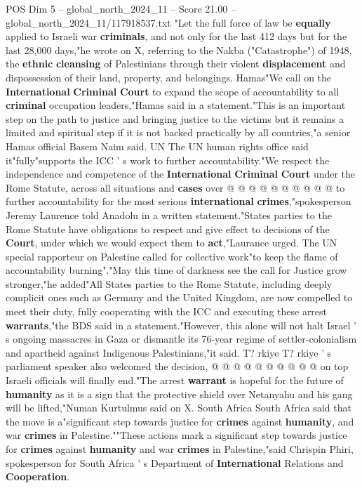 \begin{textsample}{POS Dim 5 – global\_north\_2024\_11 – Score 21.00 – global\_north\_2024\_11/117918537.txt}  \label{ex:f5_pos_037}
"Let the full force of law be \textbf{equally} applied to Israeli war \textbf{criminals}, and not only for the last 412 days but for the last 28,000 days,"he wrote on X, referring to the Nakba ("Catastrophe") of 1948, the \textbf{ethnic} \textbf{cleansing} of Palestinians through their violent \textbf{displacement} and dispossession of their land, property, and belongings.
Hamas"We call on the \textbf{International} \textbf{Criminal} \textbf{Court} to expand the scope of accountability to all \textbf{criminal} occupation leaders,"Hamas said in a statement."This is an important step on the path to justice and bringing justice to the victims but it remains a limited and spiritual step if it is not backed practically by all countries,"a senior Hamas official Basem Naim said.
UN The UN human rights office said it"fully"supports the ICC ' s work to further accountability."We respect the independence and competence of the \textbf{International} \textbf{Criminal} \textbf{Court} under the Rome Statute, across all situations and \textbf{cases} over @ @ @ @ @ @ @ @ @ @ to further accountability for the most serious \textbf{international} \textbf{crimes},"spokesperson Jeremy Laurence told Anadolu in a written statement."States parties to the Rome Statute have obligations to respect and give effect to decisions of the \textbf{Court}, under which we would expect them to \textbf{act},"Laurance urged.
The UN special rapporteur on Palestine called for collective work"to keep the flame of accountability burning"."May this time of darkness see the call for Justice grow stronger,"he added"All States parties to the Rome Statute, including deeply complicit ones such as Germany and the United Kingdom, are now compelled to meet their duty, fully cooperating with the ICC and executing these arrest \textbf{warrants},"the BDS said in a statement."However, this alone will not halt Israel ' s ongoing massacres in Gaza or dismantle its 76-year regime of settler-colonialism and apartheid against Indigenous Palestinians,"it said.
T? rkiye T? rkiye ' s parliament speaker also welcomed the decision, @ @ @ @ @ @ @ @ @ @ on top Israeli officials will finally end."The arrest \textbf{warrant} is hopeful for the future of \textbf{humanity} as it is a sign that the protective shield over Netanyahu and his gang will be lifted,"Numan Kurtulmus said on X.
South Africa South Africa said that the move is a"significant step towards justice for \textbf{crimes} against \textbf{humanity}, and war \textbf{crimes} in Palestine.""These actions mark a significant step towards justice for \textbf{crimes} against \textbf{humanity} and war \textbf{crimes} in Palestine,"said Chrispin Phiri, spokesperson for South Africa ' s Department of \textbf{International} Relations and \textbf{Cooperation}.

\end{textsample}
